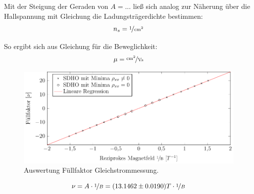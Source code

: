 Mit der Steigung der Geraden von $A=...$  %
ließ sich analog zur Näherung über die Hallspannung mit Gleichung %
die Ladungsträgerdichte bestimmen:
\begin{equation}
n_s= \unitfrac{1}{cm^2}   %
\end{equation}

So ergibt sich aus Gleichung %
für die Beweglichkeit:
\begin{equation}
\mu= \unitfrac{cm^2}{Vs}   %
\end{equation}
 

\begin{figure}[h]
	\centering
	\includegraphics{graphs/dc/auswertung.pdf}
	\caption[Auswertung Füllfaktor Gleichstrommessung]{
		Auswertung Füllfaktor Gleichstrommessung.
	}
	\label{fig:dc_sdho_ausw}
\end{figure}

\begin{equation}
\nu= A\cdot \nicefrac{1}{B}=(13.1462 \pm 0.0190)T \cdot \nicefrac{1}{B}
\end{equation}